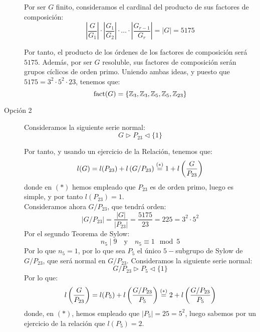 \documentclass[12pt]{article}
\DeclareMathOperator{\fact}{fact}
\begin{document}
\begin{ejercicio}[2.5 puntos]
\begin{description}
            Por ser $G$ finito, consideramos el cardinal del producto de sus factores de composición:
            \begin{equation*}
                \left|\dfrac{G}{G_1}\right| \cdot \left|\dfrac{G_1}{G_2}\right| \cdot \ldots \cdot \left|\dfrac{G_{r-1}}{G_r}\right| = |G| = 5175
            \end{equation*}

            Por tanto, el producto de los órdenes de los factores de composición será $5175$. Además, por ser $G$ resoluble, sus factores de composición serán grupos cíclicos de orden primo. Uniendo ambas ideas, y puesto que $5175 = 3^2 \cdot 5^2 \cdot 23$, tenemos que:
            \begin{equation*}
                \fact(G)=\{\bb{Z}_3,\bb{Z}_3,\bb{Z}_5,\bb{Z}_5,\bb{Z}_{23}\}
            \end{equation*} 

            \item[Opción 2] Consideramos la siguiente serie normal:
            \begin{equation*}
                G \rhd P_{23} \lhd \{1\}
            \end{equation*}

            Por tanto, y usando un ejercicio de la Relación, tenemos que:
            \begin{equation*}
                l(G)=l(P_{23}) + l\left(G/P_{23}\right) \stackrel{(\ast)}{=} 1 + l\left(\dfrac{G}{P_{23}}\right)
            \end{equation*}
            donde en $(\ast)$ hemos empleado que $P_{23}$ es de orden primo, luego es simple, y por tanto $l(P_{23}) = 1$.\\

            Consideramos ahora $G/P_{23}$, que tendrá orden:
            \begin{equation*}
                |G/P_{23}| = \dfrac{|G|}{|P_{23}|} = \dfrac{5175}{23} = 225 = 3^2\cdot 5^2
            \end{equation*}
            Por el segundo Teorema de Sylow:
            \begin{equation*}
                n_5 \mid 9 \quad \text{y} \quad n_5 \equiv 1 \mod 5
            \end{equation*}
            Por lo que $n_5 = 1$, por lo que sea $P_5$ el único $5-$subgrupo de Sylow de $G/P_{23}$, que será normal en $G/P_{23}$. Consideramos la siguiente serie normal:
            \begin{equation*}
                G/P_{23} \rhd P_5 \lhd \{1\}
            \end{equation*}
            Por lo que:
            \begin{equation*}
                l\left(\dfrac{G}{P_{23}}\right) = l(P_5) + l\left(\dfrac{G/P_{23}}{P_5}\right)
                \stackrel{(\ast)}{=} 2 + l\left(\dfrac{G/P_{23}}{P_5}\right)
            \end{equation*}
            donde, en $(\ast)$, hemos empleado que $|P_5| = 25 = 5^2$, luego sabemos por un ejercicio de la relación que $l(P_5) = 2$.\\


\end{description}
\end{ejercicio}
\end{document}
